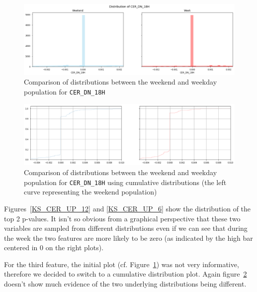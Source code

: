\begin{figure}[ht]
    \begin{center}
    \includegraphics[width=1\linewidth]{images/KS_CER_DN_18.png}    
    \end{center}
	\caption{Comparison of distributions between the weekend and weekday population for \texttt{CER\_DN\_18H}}
    \label{KS_CER_DN_18}
\end{figure}

\begin{figure}[ht]
    \begin{center}
    \includegraphics[width=1\linewidth]{images/KS_CER_DN_18_CUMUL.png}    
    \end{center}
    \caption{Comparison of distributions between the weekend and weekday population for \texttt{CER\_DN\_18H} using cumulative distributions (the left curve representing the weekend population)}
    \label{KS_CER_DN_18_CUMUL}
\end{figure}

Figures~\ref{KS_CER_UP_12} and \ref{KS_CER_UP_6} show the distribution of the top 2 p-values. It isn't so obvious from a graphical perspective that these two variables are sampled from different distributions even if we can see that during the week the two features are more likely to be zero (as indicated by the high bar centered in 0 on the right plots). 

For the third feature, the initial plot (cf. Figure~\ref{KS_CER_DN_18}) was not very informative, therefore we decided to switch to a cumulative distribution plot. Again figure~\ref{KS_CER_DN_18_CUMUL} doesn't show much evidence of the two underlying distributions being different.

